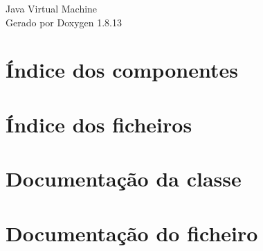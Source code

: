 \documentclass[twoside]{book}
\newcommand{\+}{\discretionary{\mbox{\scriptsize$\hookleftarrow$}}{}{}}
\newcommand{\clearemptydoublepage}{%
  \newpage{\pagestyle{empty}\cleardoublepage}%
}
\begin{document}
\hypersetup{pageanchor=false,
             bookmarksnumbered=true,
             pdfencoding=unicode
            }
\begin{titlepage}
\vspace*{7cm}
\begin{center}%
{\Large Java Virtual Machine }\\
\vspace*{1cm}
{\large Gerado por Doxygen 1.8.13}\\
\end{center}
\end{titlepage}
\clearemptydoublepage
{}
\tableofcontents
\clearemptydoublepage
{}
\hypersetup{pageanchor=true}

\chapter{Índice dos componentes}

\chapter{Índice dos ficheiros}

\chapter{Documentação da classe}


























\chapter{Documentação do ficheiro}




































\backmatter
\newpage
{}
\clearemptydoublepage
{}
\printindex
\end{document}
